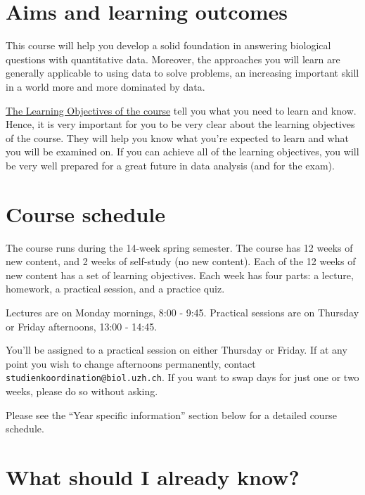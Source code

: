 \documentclass[
  letterpaper,
  8pt,
  a4paper]{book}
\begin{document}
\section*{Aims and learning outcomes}\label{aims-and-learning-outcomes}


This course will help you develop a solid foundation in answering
biological questions with quantitative data. Moreover, the approaches
you will learn are generally applicable to using data to solve problems,
an increasing important skill in a world more and more dominated by
data.

\href{https://github.com/opetchey/BIO144/raw/master/1_learning_objectives/Weekly_learning_objectives.pdf}{The
Learning Objectives of the course} tell you what you need to learn and
know. Hence, it is very important for you to be very clear about the
learning objectives of the course. They will help you know what you're
expected to learn and what you will be examined on. If you can achieve
all of the learning objectives, you will be very well prepared for a
great future in data analysis (and for the exam).

\section*{Course schedule}\label{course-schedule}


The course runs during the 14-week spring semester. The course has 12
weeks of new content, and 2 weeks of self-study (no new content). Each
of the 12 weeks of new content has a set of learning objectives. Each
week has four parts: a lecture, homework, a practical session, and a
practice quiz.

Lectures are on Monday mornings, 8:00 - 9:45. Practical sessions are on
Thursday or Friday afternoons, 13:00 - 14:45.

You'll be assigned to a practical session on either Thursday or Friday.
If at any point you wish to change afternoons permanently, contact
\texttt{studienkoordination@biol.uzh.ch}. If you want to swap days for
just one or two weeks, please do so without asking.

Please see the ``Year specific information'' section below for a
detailed course schedule.

\section*{What should I already know?}\label{what-should-i-already-know}
\end{document}

